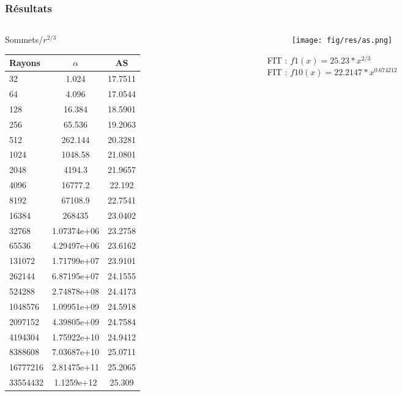 \begin{frame}
  \frametitle{Résultats}
	\begin{columns}[t]
 		\begin{column}{4cm}
  		\begin{block}{Sommets/$r^{2/3}$}
				\begin{tiny}
					\begin{tabular}{|l|c|c|}
						\hline
						Rayons & $\alpha$ & AS\\
						\hline
            32 & 1.024 & 17.7511\\
            64 & 4.096 & 17.0544\\
            128 & 16.384 & 18.5901\\
            256 & 65.536 & 19.2063\\
            512 & 262.144 & 20.3281\\
            1024 & 1048.58 & 21.0801\\
            2048 & 4194.3 & 21.9657\\
            4096 & 16777.2 & 22.192\\
            8192 & 67108.9 & 22.7541\\
            16384 & 268435 & 23.0402\\
            32768 & 1.07374e+06 & 23.2758\\
            65536 & 4.29497e+06 & 23.6162\\
            131072 & 1.71799e+07 & 23.9101\\
            262144 & 6.87195e+07 & 24.1555\\
            524288 & 2.74878e+08 & 24.4173\\
            1048576 & 1.09951e+09 & 24.5918\\
            2097152 & 4.39805e+09 & 24.7584\\
            4194304 & 1.75922e+10 & 24.9412\\
            8388608 & 7.03687e+10 & 25.0711\\
            16777216 & 2.81475e+11 & 25.2065\\
            33554432 & 1.1259e+12 & 25.309 \\
					  \hline
					\end{tabular}  
				\end{tiny}
			\end{block} 
		\end{column}
		\begin{column}{6.5cm}
				\begin{figure}[h!]
					\centering
				  \texttt{[image: fig/res/as.png]}
			 	\end{figure}    
        \begin{block}{}
            FIT :  $f1(x) = 25.23*x^{2/3}$\\
            FIT :  $f10(x) = 22.2147*x^{0.674212}$ 
          \end{block} 
		\end{column}
	\end{columns} 
\end{frame}

